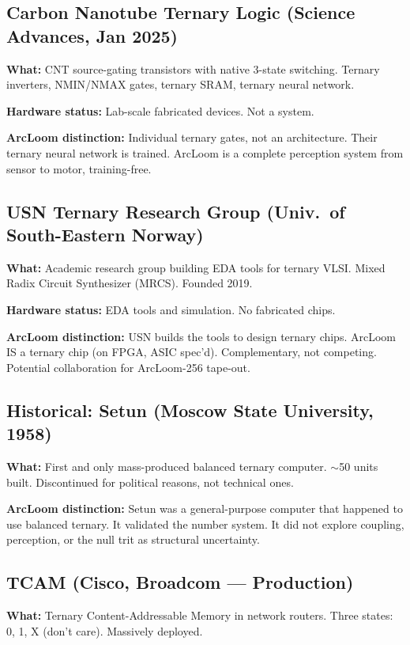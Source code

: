 \documentclass[11pt, a4paper]{article}
\begin{document}
\subsection{Carbon Nanotube Ternary Logic (Science Advances, Jan 2025)}

\textbf{What:} CNT source-gating transistors with native 3-state
switching. Ternary inverters, NMIN/NMAX gates, ternary SRAM, ternary
neural network.

\textbf{Hardware status:} Lab-scale fabricated devices. Not a system.

\textbf{ArcLoom distinction:} Individual ternary gates, not an
architecture. Their ternary neural network is trained. ArcLoom is a
complete perception system from sensor to motor, training-free.

\subsection{USN Ternary Research Group (Univ.\ of South-Eastern Norway)}

\textbf{What:} Academic research group building EDA tools for ternary
VLSI. Mixed Radix Circuit Synthesizer (MRCS). Founded 2019.

\textbf{Hardware status:} EDA tools and simulation. No fabricated chips.

\textbf{ArcLoom distinction:} USN builds the tools to design ternary
chips. ArcLoom IS a ternary chip (on FPGA, ASIC spec'd). Complementary,
not competing. Potential collaboration for ArcLoom-256 tape-out.

\subsection{Historical: Setun (Moscow State University, 1958)}

\textbf{What:} First and only mass-produced balanced ternary computer.
$\sim$50 units built. Discontinued for political reasons, not technical ones.

\textbf{ArcLoom distinction:} Setun was a general-purpose computer that
happened to use balanced ternary. It validated the number system. It did
not explore coupling, perception, or the null trit as structural
uncertainty.

\subsection{TCAM (Cisco, Broadcom --- Production)}

\textbf{What:} Ternary Content-Addressable Memory in network routers.
Three states: 0, 1, X (don't care). Massively deployed.
\end{document}
